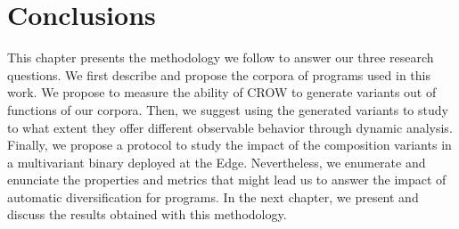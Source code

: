 





\section{Conclusions}

This chapter presents the methodology we follow to answer our three research questions. We first describe and propose the corpora of programs used in this work. We propose to measure the ability of CROW to generate variants out of  functions of our corpora. Then, we suggest using the generated variants to study to what extent they offer different observable behavior through  dynamic analysis. Finally, we propose a protocol to study the impact of the composition variants in a multivariant binary deployed at the Edge. Nevertheless, we enumerate and enunciate the properties and metrics that might lead us to answer the impact of automatic diversification for \wasm programs. In the next chapter, we present and discuss the results obtained with this methodology.